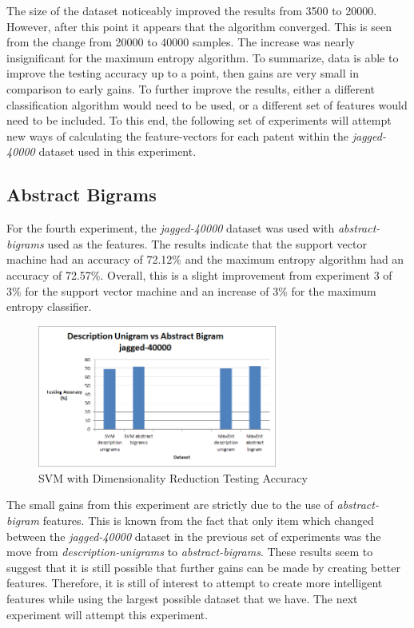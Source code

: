 The size of the dataset noticeably improved the results from 3500 to 20000.  However, after this point it appears that the algorithm converged.  This is seen from the change from 20000 to 40000 samples.  The increase was nearly insignificant for the maximum entropy algorithm.  To summarize, data is able to improve the testing accuracy up to a point, then gains are very small in comparison to early gains.  To further improve the results, either a different classification algorithm would need to be used, or a different set of features would need to be included.  To this end, the following set of experiments will attempt new ways of calculating the feature-vectors for each patent within the \emph{jagged-40000} dataset used in this experiment.

\subsection{Abstract Bigrams}
For the fourth experiment, the \emph{jagged-40000} dataset was used with \emph{abstract-bigrams} used as the features.  The results indicate that the support vector machine had an accuracy of 72.12\% and the maximum entropy algorithm had an accuracy of 72.57\%.  Overall, this is a slight improvement from experiment 3 of 3\% for the support vector machine and an increase of 3\% for the maximum entropy classifier.

\begin{figure}[!h]
\begin{center}
\caption{SVM with Dimensionality Reduction Testing Accuracy}
\includegraphics[width=0.7\textwidth]{Unigrams_vs_Bigrams.png}
\end{center}
\end{figure}

The small gains from this experiment are strictly due to the use of \emph{abstract-bigram} features.  This is known from the fact that only item which changed between the \emph{jagged-40000} dataset in the previous set of experiments was the move from \emph{description-unigrams} to \emph{abstract-bigrams}.  These results seem to suggest that it is still possible that further gains can be made by creating better features. Therefore, it is still of interest to attempt to create more intelligent features while using the largest possible dataset that we have.  The next experiment will attempt this experiment. 

